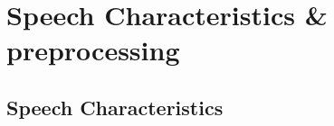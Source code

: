 \documentclass[12pt, a4paper, twoside]{report}
\begin{document}

\chapter{Speech Characteristics \& preprocessing}
\section{Speech Characteristics}
\end{document}
